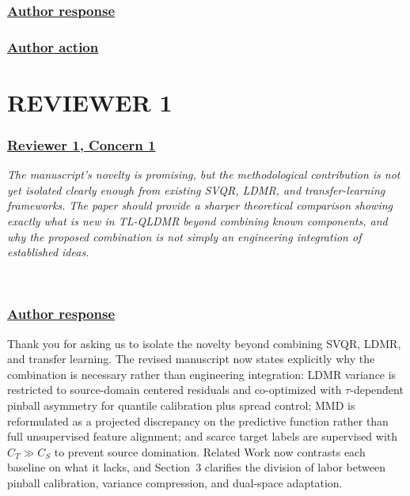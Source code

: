 \documentclass[journal,12pn, onecolumn]{IEEEtran}
\begin{document}
{\color{black}
\subsubsection*{\textbf{\underline{Author response}}}

{\color{black}
\subsubsection*{\textbf{\underline{Author action}}}

\newpage

{\color{black}
\section*{\textbf{REVIEWER 1}\label{rev1}}

\textcolor{customgreen}{
\subsubsection*{\underline{\textbf{Reviewer 1, Concern 1}}}
\emph{The manuscript's novelty is promising, but the methodological contribution is not yet isolated clearly enough from existing SVQR, LDMR, and transfer-learning frameworks. The paper should provide a sharper theoretical comparison showing exactly what is new in TL-QLDMR beyond combining known components, and why the proposed combination is not simply an engineering integration of established ideas.}
}\\

{\color{black}
\subsubsection*{\textbf{\underline{Author response}}}
Thank you for asking us to isolate the novelty beyond combining SVQR, LDMR, and transfer learning. The revised manuscript now states explicitly why the combination is necessary rather than engineering integration: LDMR variance is restricted to source-domain centered residuals and co-optimized with $\tau$-dependent pinball asymmetry for quantile calibration plus spread control; MMD is reformulated as a projected discrepancy on the predictive function rather than full unsupervised feature alignment; and scarce target labels are supervised with $C_T \gg C_S$ to prevent source domination. Related Work now contrasts each baseline on what it lacks, and Section~3 clarifies the division of labor between pinball calibration, variance compression, and dual-space adaptation.

}}}}
\end{document}
